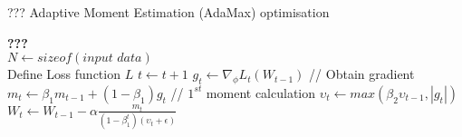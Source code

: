 \begin{algorithm}
  \caption{??? Adaptive Moment Estimation (AdaMax) optimisation}
  \begin{algorithmic}[1]
    \STATE \textbf{???} \\ $N\gets sizeof(\textit{input data})$\\
    \STATE Define Loss function $L$
    \STATE $t \gets t+1$
    \STATE $g_t \gets \nabla_\phi L_t (W_{t-1})$ // Obtain gradient
    \STATE $m_t \gets \beta_1 m_{t-1}+(1-\beta_1) g_t $ // $1^{st}$ moment calculation
    \STATE $\upsilon_t \gets max\left(\beta_2\upsilon_{t-1}, |g_t|\right) $
    \STATE $W_t \gets W_{t-1}- \alpha \frac{m_t}{(1-\beta^t_1)(\upsilon_t+\epsilon)} $ \\
    \ENDWHILE
  \end{algorithmic}
  \label{alg:adamax}
\end{algorithm}
